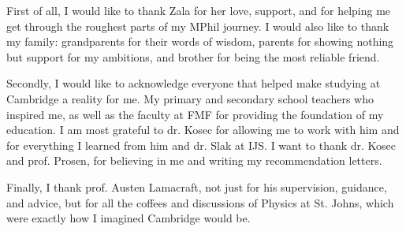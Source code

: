
\begin{acknowledgements}      
First of all, I would like to thank Zala for her love, support, and for helping me get through the roughest parts of my MPhil journey. I would also like to thank my family: grandparents for their words of wisdom, parents for showing nothing but support for my ambitions, and brother for being the most reliable friend. 

Secondly, I would like to acknowledge everyone that helped make studying at Cambridge a reality for me. My primary and secondary school teachers who inspired me, as well as the faculty at FMF for providing the foundation of my education. I am most grateful to dr. Kosec for allowing me to work with him and for everything I learned from him and dr. Slak at IJS.  I want to thank dr. Kosec and prof. Prosen, for believing in me and writing my recommendation letters. 

Finally, I thank prof. Austen Lamacraft, not just for his supervision, guidance, and advice, but for all the coffees and discussions of Physics at St. Johns, which were exactly how I imagined Cambridge would be. 
\end{acknowledgements}
